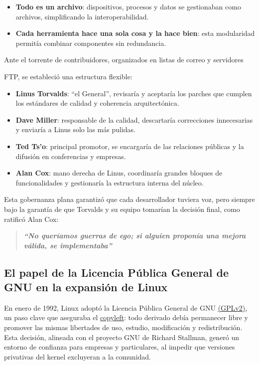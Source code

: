 \documentclass[a4paper,12pt]{article}
\begin{document}
\begin{itemize}[label=$\bullet$, itemsep=0.5em]
    \item \textbf{Todo es un archivo}: dispositivos, procesos y datos se
    gestionaban como archivos, simplificando la interoperabilidad.     
    \item \textbf{Cada herramienta hace una sola cosa y la hace bien}:
    esta modularidad permitía combinar componentes sin redundancia.
\end{itemize}

Ante el torrente de contribuidores, organizados en listas de correo y servidores

FTP, se estableció una estructura flexible:
\begin{itemize}[label=$\bullet$, itemsep=0.5em]
    \item \textbf{Linus Torvalds}: ``el General'', revisaría y aceptaría los parches que
    cumplen los estándares de calidad y coherencia arquitectónica. 
    \item \textbf{Dave Miller}: responsable de la calidad, descartaría correcciones
    innecesarias y enviaría a Linus solo las más pulidas.  
    \item \textbf{Ted Ts’o}: principal promotor, se encargaría de las relaciones
    públicas y la difusión en conferencias y empresas.  
    \item \textbf{Alan Cox}: mano derecha de Linus, coordinaría grandes bloques de
    funcionalidades y gestionaría la estructura interna del núcleo.
\end{itemize} 

Esta gobernanza plana garantizó que cada desarrollador tuviera voz, pero siempre
bajo la garantía de que Torvalds y su equipo tomarían la decisión final, como
ratificó Alan Cox:

\begin{quote}
    \textbf{\textit{“No queríamos guerras de ego; si alguien proponía una mejora válida, se
    implementaba”}} 
\end{quote}
\newpage

\subsection{El papel de la Licencia Pública General de GNU en la expansión de Linux}

En enero de 1992, Linux adoptó la Licencia Pública General de GNU \hyperlink{gpl}{(GPLv2)}, un
paso clave que aseguraba el \hyperlink{copyleft}{copyleft}: todo derivado debía permanecer libre y
promover las mismas libertades de uso, estudio, modificación y redistribución. 
Esta decisión, alineada con el proyecto GNU de Richard Stallman, generó un
entorno de confianza para empresas y particulares, al impedir que versiones
privativas del kernel excluyeran a la comunidad.
\end{document}
